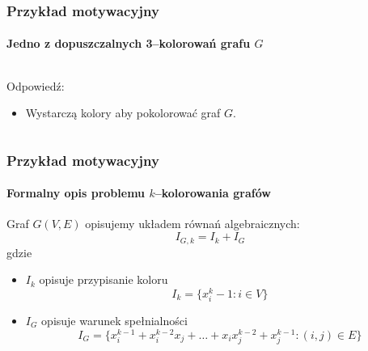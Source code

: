 \documentclass{beamer}
\begin{document}
\begin{frame}
    \frametitle{Przykład motywacyjny}
    \framesubtitle{Jedno z dopuszczalnych 3--kolorowań grafu $G$}

    \begin{columns}
        \begin{column}[l]{0.5\textwidth}
            Odpowiedź:
                \begin{itemize}
                    \item Wystarczą  kolory \newline aby pokolorować graf $G$.
                \end{itemize}
        \end{column}
        \begin{column}[r]{0.4\textwidth}
            \begin{center}
                
            \end{center}
        \end{column}
    \end{columns}
\end{frame}

\begin{frame}
    \frametitle{Przykład motywacyjny}
    \framesubtitle{Formalny opis problemu $k$--kolorowania grafów}

    Graf $G(V, E)$ opisujemy układem równań algebraicznych:
    \begin{equation*}
        I_{G,k} = I_k + I_G
    \end{equation*}
    gdzie
    \pause
    \begin{itemize}
        \item $I_k$ opisuje przypisanie koloru
            \begin{equation*}
                I_k = \{ x_i^k - 1 : i \in V \}
            \end{equation*}
            \pause
        \item $I_G$ opisuje warunek spełnialności
            \begin{equation*}
                I_G = \{ x_{i}^{k-1} + x_{i}^{k-2} x_{j} + \ldots + x_{i} x_{j}^{k-2} + x_{j}^{k-1} : (i, j) \in E \}
            \end{equation*}
    \end{itemize}
\end{frame}
\end{document}
